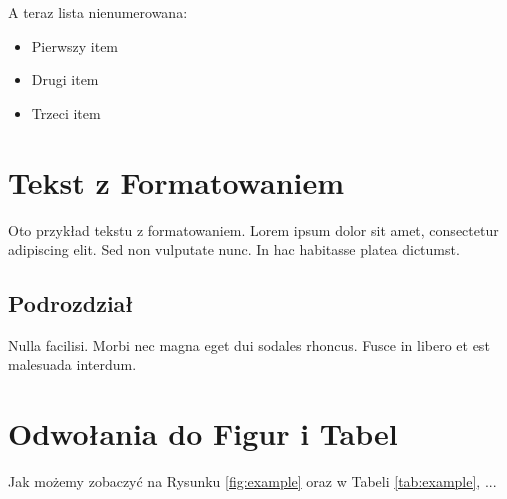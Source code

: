 \documentclass{article}
\begin{document}
A teraz lista nienumerowana:
\begin{itemize}
    \item Pierwszy item
    \item Drugi item
    \item Trzeci item
\end{itemize}

\section{Tekst z Formatowaniem}
Oto przykład tekstu z formatowaniem. Lorem ipsum dolor sit amet, consectetur adipiscing elit. Sed non vulputate nunc. In hac habitasse platea dictumst.

\subsection{Podrozdział}
Nulla facilisi. Morbi nec magna eget dui sodales rhoncus. Fusce in libero et est malesuada interdum. 

\section{Odwołania do Figur i Tabel}
Jak możemy zobaczyć na Rysunku \ref{fig:example} oraz w Tabeli \ref{tab:example}, ...
\end{document}
